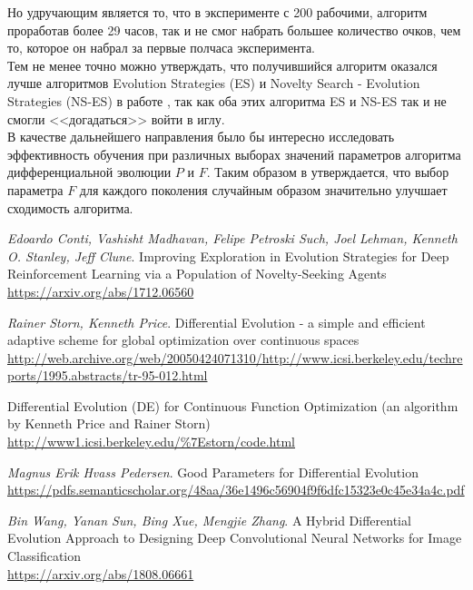 \documentclass[12pt]{article}
\begin{document}
    Но удручающим является то, что в эксперименте с 200 рабочими, алгоритм проработав более 29 часов, так и не смог набрать большее количество очков, чем то, которое он набрал за первые полчаса эксперимента. \\

    Тем не менее точно можно утверждать, что получившийся алгоритм оказался лучше алгоритмов Evolution Strategies (ES) и Novelty Search - Evolution Strategies (NS-ES) в работе \cite{uber}, так как оба этих алгоритма ES и NS-ES так и не смогли <<догадаться>> войти в иглу. \\

    В качестве дальнейшего направления было бы интересно исследовать эффективность обучения при различных выборах значений параметров алгоритма дифференциальной эволюции $P$ и $F$. Таким образом в \cite{DE} утверждается, что выбор параметра $F$ для каждого поколения случайным образом значительно улучшает сходимость алгоритма.

\newpage
{}
\begin{thebibliography}{}
    \emph{Edoardo Conti, Vashisht Madhavan, Felipe Petroski Such, Joel Lehman, Kenneth O. Stanley, Jeff Clune}.
    Improving Exploration in Evolution Strategies for Deep Reinforcement Learning via a Population of Novelty-Seeking Agents \\
    \url{https://arxiv.org/abs/1712.06560}
    
    \emph{Rainer Storn, Kenneth Price}. Differential Evolution - a simple and efficient adaptive scheme for global optimization over continuous spaces \\
    \url{http://web.archive.org/web/20050424071310/http://www.icsi.berkeley.edu/techreports/1995.abstracts/tr-95-012.html}

    Differential Evolution (DE) for Continuous Function Optimization (an algorithm by Kenneth Price and Rainer Storn) \\
    \url{http://www1.icsi.berkeley.edu/\%7Estorn/code.html}

    \emph{Magnus Erik Hvass Pedersen}. Good Parameters for Differential Evolution \\
    \url{https://pdfs.semanticscholar.org/48aa/36e1496c56904f9f6dfc15323e0c45e34a4c.pdf}

    \emph{Bin Wang, Yanan Sun, Bing Xue, Mengjie Zhang}. A Hybrid Differential Evolution Approach to Designing Deep Convolutional Neural Networks for Image Classification \\
    \url{https://arxiv.org/abs/1808.06661}

\end{thebibliography}
\end{document}

